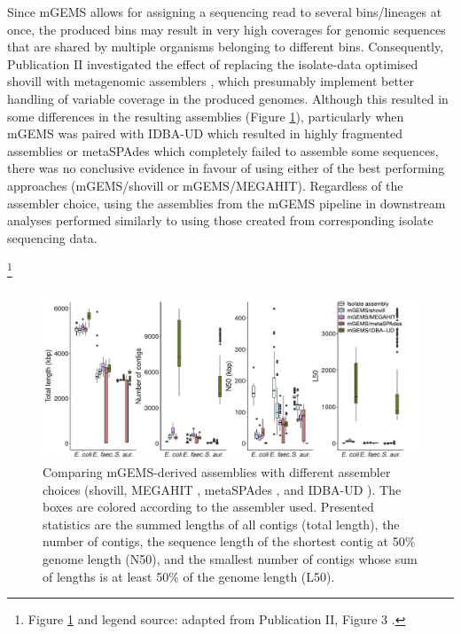 \documentclass[officiallayout]{tktla}
\let\svthefootnote\thefootnote
\begin{document}
Since mGEMS allows for assigning a sequencing read to several
bins/lineages at once, the produced bins may result in very high
coverages for genomic sequences that are shared by multiple organisms
belonging to different bins. Consequently, Publication II investigated the effect of replacing the
isolate-data optimised shovill with metagenomic assemblers
\citep{peng2012idba, li2015megahit, nurk2017metaspades}, which
presumably implement better handling of variable coverage in the
produced genomes. Although this resulted in some differences in the
resulting assemblies (Figure
\ref{fig:mgems-assembler-choice-statistics}), particularly when mGEMS
was paired with IDBA-UD which resulted in highly fragmented assemblies
or metaSPAdes which completely failed to assemble some sequences,
there was no conclusive evidence in favour of using either of the best
performing approaches (mGEMS/shovill or mGEMS/MEGAHIT). Regardless of
the assembler choice, using the assemblies from the mGEMS pipeline in
downstream analyses performed similarly to using those created from
corresponding isolate sequencing data.

\noindent\let\thefootnote\relax\footnote{Figure \ref{fig:mgems-assembler-choice-statistics} and legend source: adapted from Publication II, Figure 3 \citep{maklin_bacterial_2021}.}
\addtocounter{footnote}{-1}\let\thefootnote\svthefootnote
\begin{figure}[!t]
    \centering
    \includegraphics[width=\textwidth,keepaspectratio]{img/reproduced/MGen2021_mGEMS_Figure_3d.pdf}
    \caption{Comparing mGEMS-derived assemblies with different
      assembler choices (shovill, MEGAHIT \citep{li2015megahit},
      metaSPAdes \citep{nurk2017metaspades}, and IDBA-UD
      \citep{peng2012idba}). The boxes are colored according to the
      assembler used. Presented statistics are the summed lengths
      of all contigs (total length), the number of contigs, the
      sequence length of the shortest contig at 50\% genome length
      (N50), and the smallest number of contigs whose sum of lengths
      is at least 50\% of the genome length (L50).}
    \label{fig:mgems-assembler-choice-statistics}
\end{figure}
\end{document}
